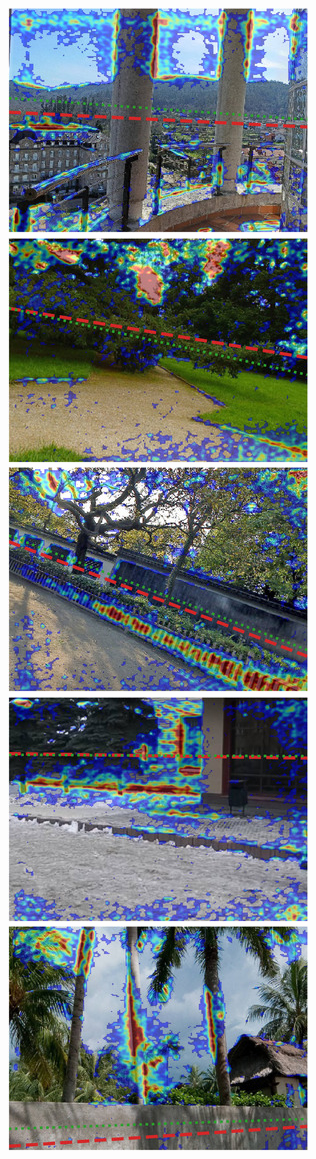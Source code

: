 \includegraphics{sgbp/thumb/pano_addontedcyafqk-6.jpg}
\includegraphics{sgbp/thumb/pano_addpqpwdfajota-4.jpg}
\includegraphics{sgbp/thumb/pano_addqflfuthjcbf-3.jpg}
\includegraphics{sgbp/thumb/pano_addsqkgygrcixb-3.jpg}
\includegraphics{sgbp/thumb/pano_addtdiecjavkue-1.jpg}
